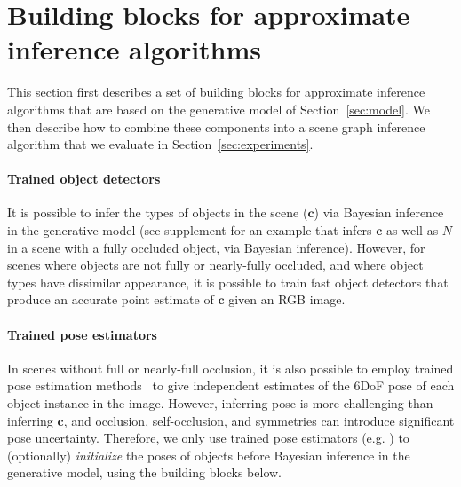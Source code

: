 \section{Building blocks for approximate inference algorithms} \label{sec:inference}

This section first describes a set of building blocks for approximate inference algorithms
that are based on the generative model of Section~\ref{sec:model}.
We then describe how to combine these components into a scene graph inference algorithm
that we evaluate in Section~\ref{sec:experiments}.

\paragraph{Trained object detectors}
It is possible to infer the types of objects in the scene ($\mathbf{c}$) via Bayesian inference in the generative model
(see supplement for an example that infers $\mathbf{c}$ as well as $N$ in a scene with a fully occluded object, via Bayesian inference).
However, for scenes where objects are not fully or nearly-fully occluded,
and where object types have dissimilar appearance,
it is possible to train fast object detectors
that produce an accurate point estimate of $\mathbf{c}$ given an RGB image.

\paragraph{Trained pose estimators}
In scenes without full or nearly-full occlusion, it is also possible to employ trained pose estimation methods~\citep{wang2019densefusion} to give independent estimates of the 6DoF pose of each object instance in the image.
However, inferring pose is more challenging than inferring $\mathbf{c}$,
and occlusion, self-occlusion, and symmetries can introduce significant pose uncertainty.
Therefore, we only use trained pose estimators (e.g. \citep{wang2019densefusion}) to (optionally) \emph{initialize} the poses of objects before Bayesian inference in the generative model, using the building blocks below.

